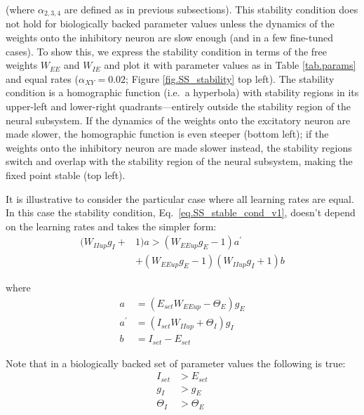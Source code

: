 \documentclass[twocolumn]{article}
\newcommand{\EE}{\mathit{EE}}
\newcommand{\IE}{\mathit{IE}}
\newcommand{\II}{\mathit{II}}
\newcommand{\XY}{\mathit{XY}}
\newcommand{\set}{\mathit{set}}
\newcommand{\up}{\mathit{up}}
\begin{document}
\noindent (where $\alpha_{2,3,4}$ are defined as in previous subsections). This stability condition does not hold for biologically backed parameter values unless the dynamics of the weights onto the inhibitory neuron are slow enough (and in a few fine-tuned cases). To show this, we express the stability condition in terms of the free weights $W_{\EE}$ and $W_{\IE}$ and plot it with parameter values as in Table \ref{tab.params} and equal rates ($\alpha_{\XY}=0.02$; Figure \ref{fig.SS_stability} top left). The stability condition is a homographic function (i.e.\ a hyperbola) with stability regions in its upper-left and lower-right quadrants---entirely outside the stability region of the neural subsystem. If the dynamics of the weights onto the excitatory neuron are made slower, the homographic function is even steeper (bottom left); if the weights onto the inhibitory neuron are made slower instead, the stability regions switch and overlap with the stability region of the neural subsystem, making the fixed point stable (top left).

It is illustrative to consider the particular case where all learning rates are equal. In this case the stability condition, Eq.\ \ref{eq.SS_stable_cond_v1}, doesn't depend on the learning rates and takes the simpler form:
\begin{equation}
\begin{aligned}
(W_{\II\up} g_I + & 1)a > (W_{\EE\up} g_E - 1)a^\prime \\
& + (W_{\EE\up} g_E - 1)(W_{\II\up} g_I + 1)b
\end{aligned}
\label{eq.SS_stable_cond_v2}
\end{equation}

\noindent where
\begin{displaymath}
\begin{aligned}
a & = (E_{\set} W_{\EE\up} - \Theta_E)g_E \\
a^\prime & = (I_{\set} W_{\II\up} + \Theta_I)g_I \\
b & = I_{\set} - E_{\set}
\end{aligned}
\end{displaymath}

\noindent Note that in a biologically backed set of parameter values the following is true:
\begin{displaymath}
\begin{aligned}
I_{\set} & > E_{\set} \\
g_I & > g_E \\
\Theta_I & > \Theta_E
\end{aligned}
\end{displaymath}
\end{document}
